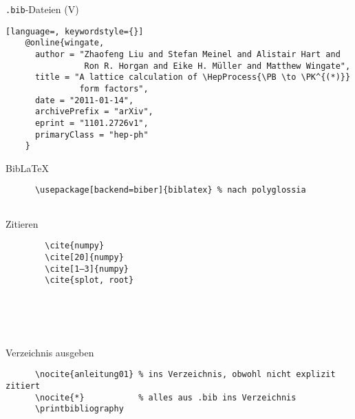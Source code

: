 \begin{frame}[fragile]{\texttt{.bib}-Dateien (V)}
  \begin{lstlisting}[language=, keywordstyle={}]
    @online{wingate,
      author = "Zhaofeng Liu and Stefan Meinel and Alistair Hart and
                Ron R. Horgan and Eike H. Müller and Matthew Wingate",
      title = "A lattice calculation of \HepProcess{\PB \to \PK^{(*)}}
               form factors",
      date = "2011-01-14",
      archivePrefix = "arXiv",
      eprint = "1101.2726v1",
      primaryClass = "hep-ph"
    }
  \end{lstlisting}
  \vspace{1em}
\end{frame}

\begin{frame}[fragile]{Bib\LaTeX\hfill{}}
  \begin{Packages}
    \begin{lstlisting}
      \usepackage[backend=biber]{biblatex} % nach polyglossia
      
    \end{lstlisting}
  \end{Packages}
  \begin{block}{Zitieren}
    \begin{minipage}{0.6\linewidth}
      \begin{lstlisting}
        \cite{numpy}
        \cite[20]{numpy}
        \cite[1–3]{numpy}
        \cite{splot, root}
      \end{lstlisting}
    \end{minipage}
    \begin{minipage}{0.35\linewidth}
      \cite{numpy} \\
      \cite[20]{numpy} \\
      \cite[1-3]{numpy} \\
      \cite{splot, root}
    \end{minipage}
  \end{block}
  \begin{block}{Verzeichnis ausgeben}
    \begin{lstlisting}
      \nocite{anleitung01} % ins Verzeichnis, obwohl nicht explizit zitiert
      \nocite{*}           % alles aus .bib ins Verzeichnis
      \printbibliography
    \end{lstlisting}
  \end{block}
\end{frame}

